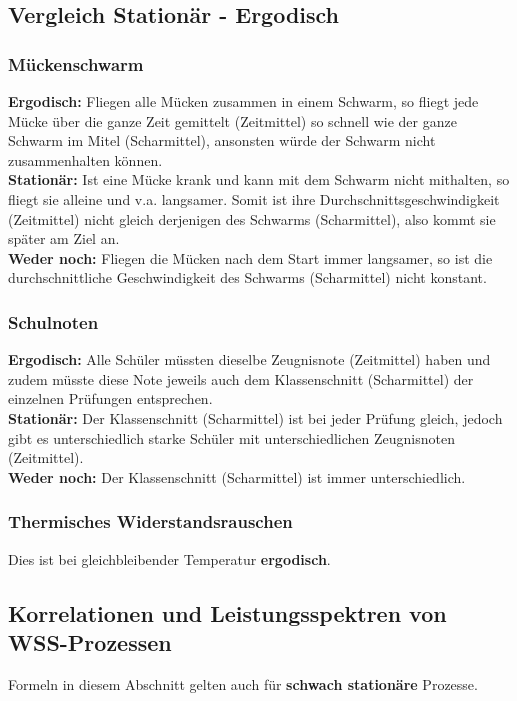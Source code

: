 \subsection{Vergleich Stationär - Ergodisch}
\subsubsection{Mückenschwarm}
\textbf{Ergodisch:} Fliegen alle Mücken zusammen in einem Schwarm, so fliegt jede Mücke über die
ganze Zeit gemittelt (Zeitmittel) so schnell wie der ganze Schwarm im Mitel (Scharmittel), ansonsten
würde der Schwarm nicht zusammenhalten können. \\
\textbf{Stationär:} Ist eine Mücke krank und kann mit dem Schwarm nicht mithalten, so fliegt sie
alleine und v.a. langsamer. Somit ist ihre Durchschnittsgeschwindigkeit (Zeitmittel) nicht gleich
derjenigen des Schwarms (Scharmittel), also kommt sie später am Ziel an. \\
\textbf{Weder noch:} Fliegen die Mücken nach dem Start immer langsamer, so ist die
durchschnittliche Geschwindigkeit des Schwarms (Scharmittel) nicht konstant.

\subsubsection{Schulnoten}
\textbf{Ergodisch:} Alle Schüler müssten dieselbe Zeugnisnote (Zeitmittel) haben und zudem müsste
diese Note jeweils auch dem Klassenschnitt (Scharmittel) der einzelnen Prüfungen entsprechen. \\
\textbf{Stationär:} Der Klassenschnitt (Scharmittel) ist bei jeder Prüfung gleich, jedoch gibt es
unterschiedlich starke Schüler mit unterschiedlichen Zeugnisnoten (Zeitmittel). \\
\textbf{Weder noch:} Der Klassenschnitt (Scharmittel) ist immer unterschiedlich.

\subsubsection{Thermisches Widerstandsrauschen} 
Dies ist bei gleichbleibender Temperatur \textbf{ergodisch}.


\subsection{Korrelationen und Leistungsspektren von WSS-Prozessen }
Formeln in diesem Abschnitt gelten auch für \textbf{schwach stationäre} Prozesse. \\

